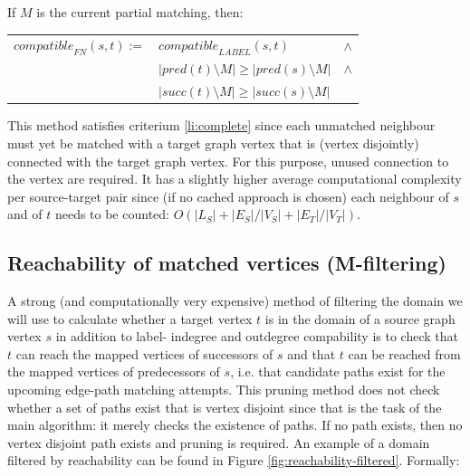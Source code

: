 \begin{minipage}{\textwidth}
\begin{defn} If $M$ is the current partial matching, then:


\begin{center}
\bgroup
\def\arraystretch{1.2}
\setlength\tabcolsep{5pt}
\begin{tabular}{lll}
\centering
$\mathit{compatible}_{\mathit{FN}}(s,t) := $&$\mathit{compatible}_{\mathit{LABEL}}(s,t)$&$\land$\\
&$ |\mathit{pred}(t) \setminus M| \geq |\mathit{pred}(s) \setminus M|$&$\land$\\
&$ |\mathit{succ}(t) \setminus M| \geq |\mathit{succ}(s) \setminus M|$
\end{tabular}
\egroup
\end{center}
 
\end{defn}
\end{minipage}

This method satisfies criterium \ref{li:complete} since each unmatched neighbour must yet be matched with a target graph vertex that is (vertex disjointly) connected with the target graph vertex. For this purpose, unused connection to the vertex are required. It has a slightly higher average computational complexity per source-target pair since (if no cached approach is chosen) each neighbour of $s$ and of $t$ needs to be counted: $O(|L_S| + |E_S|/|V_S| + |E_T|/|V_T|)$.


\subsection{Reachability of matched vertices (M-filtering)}
A strong (and computationally very expensive) method of filtering the domain we will use to calculate whether a target vertex $t$ is in the domain of a source graph vertex $s$ in addition to label- indegree and outdegree compability is to check that $t$ can reach the mapped vertices of successors of $s$ and that $t$ can be reached from the mapped vertices of predecessors of $s$, i.e. that candidate paths exist for the upcoming edge-path matching attempts. This pruning method does not check whether a set of paths exist that is vertex disjoint since that is the task of the main algorithm: it merely checks the existence of paths. If no path exists, then no vertex disjoint path exists and pruning is required. An example of a domain filtered by reachability can be found in Figure \ref{fig:reachability-filtered}. Formally:

